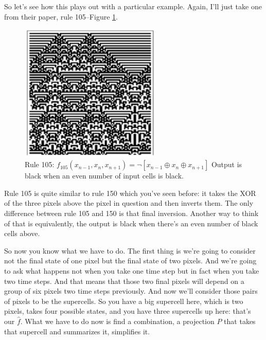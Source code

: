 \documentclass[]{article}
\newcommand*\xor{\oplus}
\begin{document}
So let's see how this plays out with a particular example. Again, I'll just take one from their paper, rule 105--Figure \ref{fig:cellular-automaton-rule-4a}.

\begin{figure}[H]
	\begin{center}
		\caption[Rule 105: $f_{105}(x_{n-1},x_n,x_{n+1})=\neg (x_{n-1} \xor x_n \xor x_{n+1})$]{Rule 105: $f_{105}(x_{n-1},x_n,x_{n+1})=\neg [x_{n-1} \xor x_n \xor x_{n+1}]$ Output is black when an even number of input cells is black.}\label{fig:cellular-automaton-rule-4a}
		\includegraphics[width=0.6\textwidth]{cellular-automaton-rule-4}
	\end{center}
\end{figure}
 Rule 105 is quite similar to rule 150 which you've seen before: it takes the XOR of the three pixels above the pixel in question and then inverts them.
The only difference between rule 105 and 150 is that final inversion.
Another way to think of that is equivalently, the output is black when there's an even number of black cells above.

So now you know what we have to do. The first thing is we're going to consider not the final state of one pixel but the final state of two pixels. And we're going to ask what happens not when you take one time step but in fact when you take two time steps.
And that means that those two final pixels will depend on a group of six pixels
two time steps previously.
And now we'll consider those pairs of pixels to be the supercells.
So you have a big supercell here, which is two pixels, takes four possible states,
and you have three supercells up here: that's our $\hat{f}$.
What we have to do now is find a combination, a projection
$P$ that takes that supercell and summarizes it, simplifies it.
\end{document}
